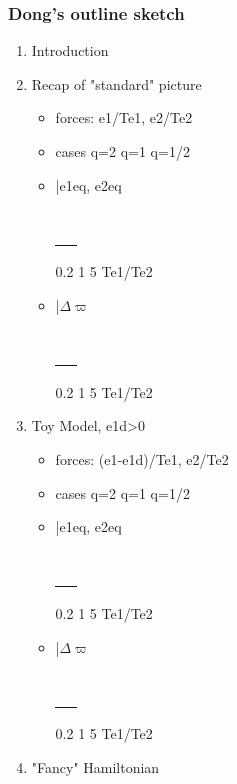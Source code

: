 \documentclass[11pt]{article}
\begin{document}
\subsubsection{Dong's outline sketch}
\label{sec:orgf5cc6e9}
\begin{enumerate}
\item Introduction
\item Recap of "standard" picture
\begin{itemize}
\item forces: e1/Te1, e2/Te2
\item cases
q=2
q=1
q=1/2
\item |e1eq, e2eq
\begin{center}
\begin{tabular}{}
\\
\uline{\uline{\uline{\uline{\uline{\uline{\uline{\_\_}}}}}}}\\
\end{tabular}
\end{center}
0.2  1  5 Te1/Te2
\item |\(\Delta\varpi\)
\begin{center}
\begin{tabular}{}
\\
\uline{\uline{\uline{\uline{\uline{\uline{\uline{\_\_}}}}}}}\\
\end{tabular}
\end{center}
0.2  1  5 Te1/Te2
\end{itemize}
\item Toy Model, e1d>0
\begin{itemize}
\item forces: (e1-e1d)/Te1, e2/Te2
\item cases
q=2
q=1
q=1/2
\item |e1eq, e2eq
\begin{center}
\begin{tabular}{}
\\
\uline{\uline{\uline{\uline{\uline{\uline{\uline{\_\_}}}}}}}\\
\end{tabular}
\end{center}
0.2  1  5 Te1/Te2
\item |\(\Delta\varpi\)
\begin{center}
\begin{tabular}{}
\\
\uline{\uline{\uline{\uline{\uline{\uline{\uline{\_\_}}}}}}}\\
\end{tabular}
\end{center}
0.2  1  5 Te1/Te2
\end{itemize}
\item "Fancy" Hamiltonian
\end{enumerate}
\end{document}
